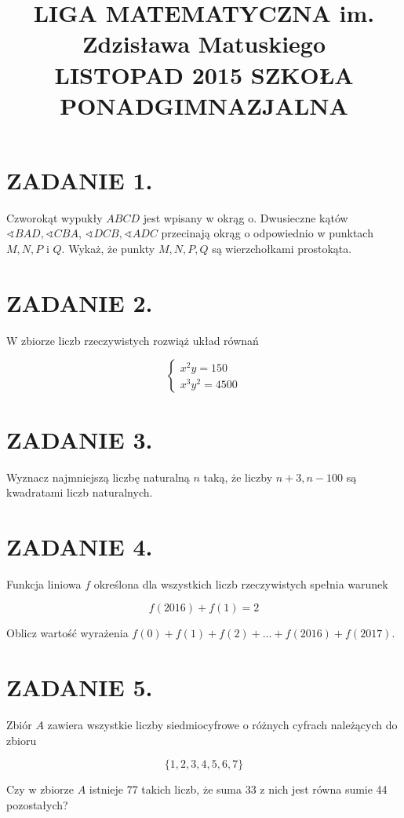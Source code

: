\documentclass[10pt]{article}
\title{LIGA MATEMATYCZNA im. Zdzisława Matuskiego \\
 LISTOPAD 2015 SZKOŁA PONADGIMNAZJALNA }
\author{}
\date{}
\newcommand\varangle{\mathop{\sphericalangle}}
\begin{document}
\maketitle
\section*{ZADANIE 1.}
Czworokąt wypukły \(A B C D\) jest wpisany w okrąg o. Dwusieczne kątów \(\varangle B A D, \varangle C B A\), \(\varangle D C B, \varangle A D C\) przecinają okrąg o odpowiednio w punktach \(M, N, P\) i \(Q\). Wykaż, że punkty \(M, N, P, Q\) są wierzchołkami prostokąta.

\section*{ZADANIE 2.}
W zbiorze liczb rzeczywistych rozwiąż układ równań

\[
\left\{\begin{array}{l}
x^{2} y=150 \\
x^{3} y^{2}=4500
\end{array}\right.
\]

\section*{ZADANIE 3.}
Wyznacz najmniejszą liczbę naturalną \(n\) taką, że liczby \(n+3, n-100\) są kwadratami liczb naturalnych.

\section*{ZADANIE 4.}
Funkcja liniowa \(f\) określona dla wszystkich liczb rzeczywistych spełnia warunek

\[
f(2016)+f(1)=2
\]

Oblicz wartość wyrażenia \(f(0)+f(1)+f(2)+\ldots+f(2016)+f(2017)\).

\section*{ZADANIE 5.}
Zbiór \(A\) zawiera wszystkie liczby siedmiocyfrowe o różnych cyfrach należących do zbioru

\[
\{1,2,3,4,5,6,7\}
\]

Czy w zbiorze \(A\) istnieje 77 takich liczb, że suma 33 z nich jest równa sumie 44 pozostałych?
\end{document}
